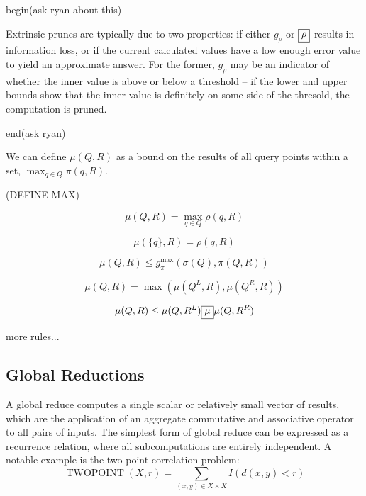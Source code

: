 \documentclass[times, 10pt,twocolumn]{article}
\DeclareMathOperator{\TWOPT}{TWOPOINT}
\newcommand{\kdleft}{^L}
\newcommand{\kdright}{^R}
\newcommand{\gpi}{g_{\pi}}
\newcommand{\allrho}{\rho}
\newcommand{\Oprho}{\fbox{$\rho$}}
\newcommand{\grho}{g_{\rho}}
\newcommand{\allmu}{\mu}
\newcommand{\Opmu}{\fbox{$\mu$}}
\begin{document}
begin(ask ryan about this)

Extrinsic prunes are typically due to two properties: if either $\grho$ or $\Oprho$ results in information loss, or if the current calculated values have a low enough error value to yield an approximate answer.
For the former, $\grho$ may be an indicator of whether the inner value is above or below a threshold -- if the lower and upper bounds show that the inner value is definitely on some side of the thresold, the computation is pruned.

end(ask ryan)

We can define $\allmu(Q, R)$ as a bound on the results of all query points within a set, $\max_{q \in Q} \pi({q}, R)$.

(DEFINE MAX)

$$\allmu(Q, R) = \max_{q \in Q} \allrho(q, R)$$

$$\allmu(\{q\}, R) = \allrho(q, R)$$

$$\allmu(Q, R) \leq \gpi^{\max}(\sigma(Q), \pi(Q, R))$$

$$\allmu(Q, R) = \max(\allmu(Q\kdleft, R), \allmu(Q\kdright, R))$$

$$\allmu(Q, R) \leq \allmu(Q, R\kdleft) \Opmu \allmu(Q, R\kdright)$$

more rules...

\subsection{Global Reductions}

A global reduce computes a single scalar or relatively small vector of results, which are the application of an aggregate commutative and associative operator to all pairs of inputs.
The simplest form of global reduce can be expressed as a recurrence relation, where all subcomputations are entirely independent.
A notable example is the two-point correlation problem:
\begin{equation*}
  \TWOPT(X, r) = \sum_{(x, y) \in X \times X} I(d(x, y) < r)
\end{equation*}
\end{document}

